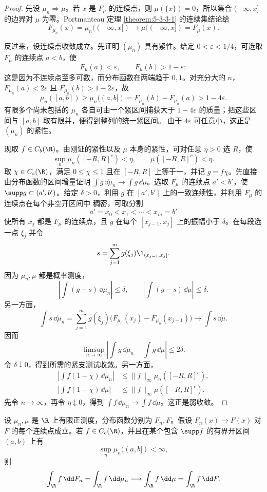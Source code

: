 \begin{proof}
先设 $\mu_n\Rightarrow\mu$。若 $x$ 是 $F_\mu$ 的连续点，则
$\mu(\{x\})=0$，所以集合 $(-\infty,x]$ 的边界对 $\mu$ 为零。Portmanteau 定理
\ref{theorem:5-3-3-1} 的连续集结论给
\[
 F_{\mu_n}(x)=\mu_n(( -\infty,x])\longrightarrow
 \mu(( -\infty,x])=F_\mu(x).
\]

反过来，设连续点收敛成立。先证明 $(\mu_n)$ 具有紧性。给定
$0<\varepsilon<1/4$，可选取
$F_\mu$ 的连续点 $a<b$，使
\[
 F_\mu(a)<\varepsilon,
 \qquad F_\mu(b)>1-\varepsilon;
\]
这是因为不连续点至多可数，而分布函数在两端趋于 $0,1$。对充分大的 $n$，
$F_{\mu_n}(a)<2\varepsilon$ 且 $F_{\mu_n}(b)>1-2\varepsilon$，故
\[
 \mu_n([a,b])\geq\mu_n((a,b])
 =F_{\mu_n}(b)-F_{\mu_n}(a)>1-4\varepsilon.
\]
有限多个尚未包括的 $\mu_n$ 各自可由一个紧区间捕获大于
$1-4\varepsilon$ 的质量；把这些区间与 $[a,b]$ 取有限并，便得到整列的统一紧区间。
由于 $4\varepsilon$ 可任意小，这正是 $(\mu_n)$ 的紧性。

 现取 $f\in C_b(\R)$。由刚证的紧性以及 $\mu$ 本身的紧性，可对任意
 $\eta>0$ 选 $R$，使
 \[
 \sup_n\mu_n([-R,R]^c)<\eta,
 \qquad \mu([-R,R]^c)<\eta.
 \]
 取 $\chi\in C_c(\R)$，满足 $0\leq\chi\leq1$ 且在 $[-R,R]$ 上等于一，并记
 $g=f\chi$。先直接由分布函数的区间增量证明
 $\int g\,\dd\mu_n\to\int g\,\dd\mu$。选取 $F_\mu$ 的连续点 $a'<b'$，使
 $\supp g\subset(a',b')$。给定
 $\delta>0$，利用 $g$ 在 $[a',b']$ 上的一致连续性，并利用 $F_\mu$ 的连续点在每个非空开区间中
 稠密，可取分割
 \[
  a'=x_0<x_1<\cdots<x_m=b'
 \]
 使所有 $x_j$ 都是 $F_\mu$ 的连续点，且 $g$ 在每个
 $[x_{j-1},x_j]$ 上的振幅小于 $\delta$。在每段选一点 $\xi_j$ 并令
 \[
  s=\sum_{j=1}^m g(\xi_j)\1_{(x_{j-1},x_j]}.
 \]
 因为 $\mu_n,\mu$ 都是概率测度，
 \[
  \left|\int(g-s)\,\dd\mu_n\right|\leq\delta,
  \qquad
  \left|\int(g-s)\,\dd\mu\right|\leq\delta.
 \]
 另一方面，
 \[
  \int s\,\dd\mu_n
  =\sum_{j=1}^m g(\xi_j)
    \bigl(F_{\mu_n}(x_j)-F_{\mu_n}(x_{j-1})\bigr)
  \longrightarrow\int s\,\dd\mu.
 \]
 因而
 \[
  \limsup_{n\to\infty}
  \left|\int g\,\dd\mu_n-\int g\,\dd\mu\right|\leq2\delta.
 \]
 令 $\delta\downarrow0$，得到所需的紧支测试收敛。另一方面，
 \begin{align*}
 \left|\int f(1-\chi)\,\dd\mu_n\right|
 &\leq\|f\|_\infty\mu_n([-R,R]^c),\\
 \left|\int f(1-\chi)\,\dd\mu\right|
 &\leq\|f\|_\infty\mu([-R,R]^c).
\end{align*}
先令 $n\to\infty$，再令 $\eta\downarrow0$，得到
$\int f\,\dd\mu_n\to\int f\,\dd\mu$。这正是弱收敛。
\end{proof}

\begin{proposition}\label{proposition:7-3-2-3}
设 $\mu_n,\mu$ 是 $\R$ 上有限正测度，分布函数分别为 $F_n,F$。假设
$F_n(x)\to F(x)$ 对 $F$ 的每个连续点成立。若 $f\in C_c(\R)$，并且在某个包含
$\supp f$ 的有界开区间 $(a,b)$ 上有
\[
 \sup_n\mu_n((a,b])<\infty,
\]
则
\[
 \int_\R f\,\dd F_n=\int_\R f\,\dd\mu_n
 \longrightarrow
 \int_\R f\,\dd\mu=\int_\R f\,\dd F.
\]
\end{proposition}

